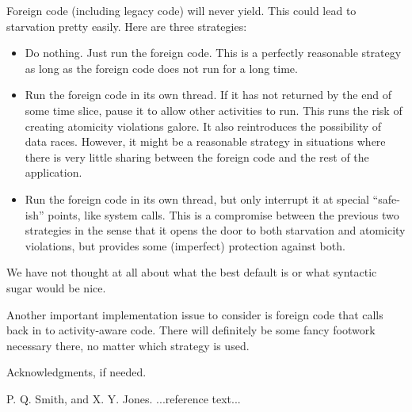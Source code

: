 \documentclass[10pt,preprint]{sigplanconf}
\begin{document}
Foreign code (including legacy code) will never yield.  This could lead
to starvation pretty easily.  Here are three strategies:

\begin{itemize}
\item Do nothing.  Just run the foreign code.  This is a perfectly
  reasonable strategy as long as the foreign code does not run for a
  long time.
\item Run the foreign code in its own thread.  If it has not returned by
  the end of some time slice, pause it to allow other activities to run.
  This runs the risk of creating atomicity violations galore.  It also
  reintroduces the possibility of data races.  However, it might be a
  reasonable strategy in situations where there is very little sharing
  between the foreign code and the rest of the application.
\item Run the foreign code in its own thread, but only interrupt it at
  special ``safe-ish'' points, like system calls.  This is a compromise
  between the previous two strategies in the sense that it opens the
  door to both starvation and atomicity violations, but provides some
  (imperfect) protection against both.
\end{itemize}

We have not thought at all about what the best default is or what
syntactic sugar would be nice.

Another important implementation issue to consider is foreign code that
calls back in to activity-aware code.  There will definitely be some
fancy footwork necessary there, no matter which strategy is used.

\acks

Acknowledgments, if needed.





\begin{thebibliography}{}
\softraggedright

P. Q. Smith, and X. Y. Jones. ...reference text...

\end{thebibliography}
\end{document}
